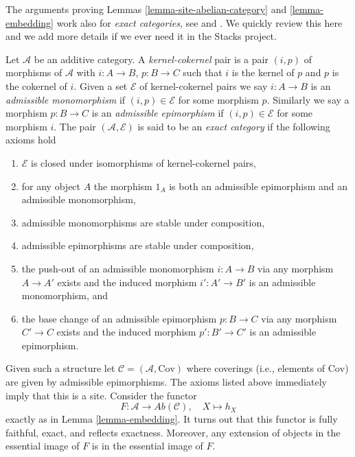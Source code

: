 \begin{remark}
\label{remark-embed-exact-category}
The arguments proving
Lemmas \ref{lemma-site-abelian-category} and
\ref{lemma-embedding}
work also for {\it exact categories}, see
\cite[Appendix A]{Buhler} and
\cite[1.1.4]{BBD}.
We quickly review this here and we add more details if we ever
need it in the Stacks project.

\medskip\noindent
Let $\mathcal{A}$ be an additive category.
A {\it kernel-cokernel} pair is a pair $(i, p)$
of morphisms of $\mathcal{A}$ with
$i : A \to B$, $p : B \to C$ such that $i$ is the kernel of
$p$ and $p$ is the cokernel of $i$.
Given a set $\mathcal{E}$ of kernel-cokernel pairs we say
$i : A \to B$ is an {\it admissible monomorphism}
if $(i, p) \in \mathcal{E}$ for some morphism $p$.
Similarly we say a morphism $p : B \to C$ is an {\it admissible epimorphism}
if $(i, p) \in \mathcal{E}$ for some morphism $i$.
The pair $(\mathcal{A}, \mathcal{E})$ is said to be an
{\it exact category} if the following axioms hold
\begin{enumerate}
\item $\mathcal{E}$ is closed under isomorphisms of kernel-cokernel
pairs,
\item for any object $A$ the morphism $1_A$ is both an admissible epimorphism
and an admissible monomorphism,
\item admissible monomorphisms are stable under composition,
\item admissible epimorphisms are stable under composition,
\item the push-out of an admissible monomorphism $i : A \to B$ via
any morphism $A \to A'$ exists and the induced morphism $i' : A' \to B'$
is an admissible monomorphism, and
\item the base change of an admissible epimorphism $p : B \to C$ via
any morphism $C' \to C$ exists and the induced morphism $p' : B' \to C'$
is an admissible epimorphism.
\end{enumerate}
Given such a structure let $\mathcal{C} = (\mathcal{A}, \text{Cov})$
where coverings (i.e., elements of $\text{Cov}$) are given by
admissible epimorphisms. The axioms listed above
immediately imply that this is a site. Consider the functor
$$
F : \mathcal{A} \longrightarrow \textit{Ab}(\mathcal{C}), \quad
X \longmapsto h_X
$$
exactly as in
Lemma \ref{lemma-embedding}.
It turns out that this functor is fully faithful, exact, and reflects
exactness. Moreover, any extension of objects in the essential image
of $F$ is in the essential image of $F$.
\end{remark}






